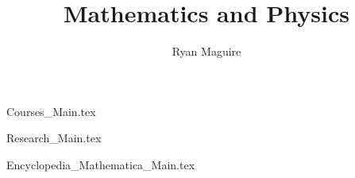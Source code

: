 \documentclass[oneside]{book}
\title{Mathematics and Physics}
\author{Ryan Maguire}
\date{\vspace{-5ex}}
\begin{document}
    \maketitle
    \tableofcontents
    \listoffigures
    \listoftables
    \clearpage
        {Courses_Main.tex}

        {Research_Main.tex}


        
               {Encyclopedia_Mathematica_Main.tex}

    \printglossary[type=\acronymtype]
    \clearpage
    \printglossary[style=long]
    \clearpage

    
\end{document}
